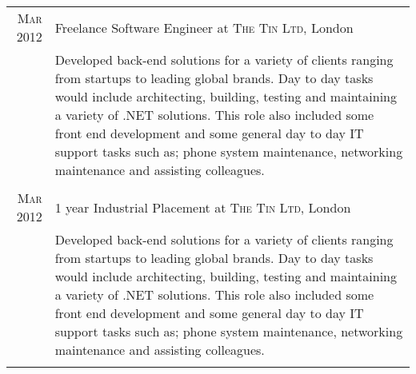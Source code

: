 \documentclass[a4paper,10pt]{article} %
\begin{document}
\begin{tabular}{r|p{11cm}}
\textsc{Mar 2012} & Freelance Software Engineer at \textsc{The Tin Ltd}, London \\

& \footnotesize{Developed back-end solutions for a variety of clients ranging from startups to leading global brands. Day to day tasks would include architecting, building, testing and maintaining a variety of .NET solutions. This role also included some front end development and some general day to day IT support tasks such as; phone system maintenance, networking maintenance and assisting colleagues.}\\
\multicolumn{2}{c}{} \\


\textsc{Mar 2012} & 1 year Industrial Placement at \textsc{The Tin Ltd}, London \\
& \footnotesize{Developed back-end solutions for a variety of clients ranging from startups to leading global brands. Day to day tasks would include architecting, building, testing and maintaining a variety of .NET solutions. This role also included some front end development and some general day to day IT support tasks such as; phone system maintenance, networking maintenance and assisting colleagues.}\\
\multicolumn{2}{c}{} \\


%
%
\end{tabular}

\end{document}
